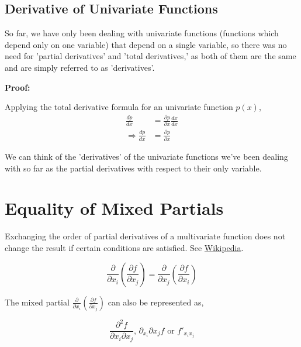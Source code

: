 \documentclass[12pt]{article}
\begin{document}
\subsection{Derivative of Univariate Functions}

So far, we have only been dealing with univariate functions (functions which depend only on one variable) that depend on a single variable, so there was no need for 'partial derivatives' and 'total derivatives,' as both of them are the same and are simply referred to as 'derivatives'. \vspace{.2cm}

\begin{note}
    \textbf{Proof:} \vspace{.2cm}

    Applying the total derivative formula for an univariate function $p(x)$,
    \begin{align*}
        \frac{dp}{dx} & = \frac{\partial p}{\partial x} \frac{dx}{dx} \\
        \Rightarrow \frac{dp}{dx} & = \frac{\partial p}{\partial x}
    \end{align*}
\end{note} \vspace{.2cm}

We can think of the 'derivatives' of the univariate functions we've been dealing with so far as the partial derivatives with respect to their only variable.

\section{Equality of Mixed Partials}

Exchanging the order of partial derivatives of a multivariate function does not change the result if certain conditions are satisfied. See \href{https://en.wikipedia.org/wiki/Symmetry_of_second_derivatives}{Wikipedia}.

\begin{equation}
    \frac{\partial}{\partial x_i} (\frac{\partial f}{\partial x_j}) = \frac{\partial}{\partial x_j} (\frac{\partial f}{\partial x_i})
\end{equation} \vspace{.2cm}

The mixed partial $\frac{\partial}{\partial x_i} (\frac{\partial f}{\partial x_j})$ can also be represented as,

\begin{equation*}
    \frac{\partial^2 f}{\partial x_i \partial x_j} \text{, } \partial_{x_i}\partial{x_j} f \text{ or } f'_{x_{i}x_{j}}
\end{equation*}
\end{document}
